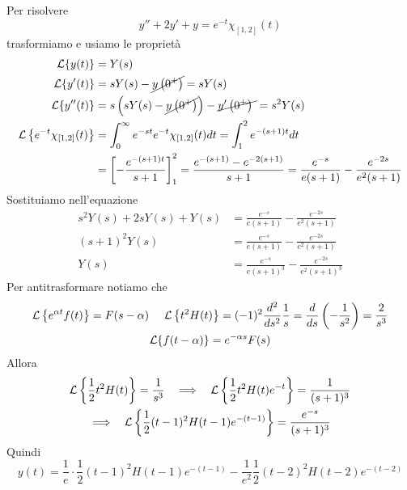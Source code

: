 Per risolvere
\begin{equation*}
y''+2y'+y=e^{-t} \chi _{[ 1,2]}( t)
\end{equation*}
trasformiamo e usiamo le proprietà
\begin{align*}
\mathcal{L}\{y( t)\} & =Y( s)\\
\mathcal{L}\{y'( t)\} & =sY( s) -\cancel{y\left( 0^{+}\right)} =sY( s)\\
\mathcal{L}\{y''( t)\} & =s\left( sY( s) -\cancel{y\left( 0^{+}\right)}\right) -\cancel{y'\left( 0^{+}\right) \ } =s^{2} Y( s)\\
\mathcal{L}\left\{e^{-t} \chi _{[ 1,2]}( t)\right\} & =\int ^{\infty }_{0} e^{-st} e^{-t} \chi _{[ 1,2]}( t) dt=\int ^{2}_{1} e^{-( s+1) t} dt\\
 & =\left[ -\frac{e^{-( s+1) t}}{s+1}\right]^{2}_{1} =\frac{e^{-( s+1)} -e^{-2( s+1)}}{s+1} =\frac{e^{-s}}{e( s+1)} -\frac{e^{-2s}}{e^{2}( s+1)}
\end{align*}
Sostituiamo nell'equazione
\begin{align*}
s^{2} Y( s) +2sY( s) +Y( s) & =\frac{e^{-s}}{e( s+1)} -\frac{e^{-2s}}{e^{2}( s+1)}\\
( s+1)^{2} Y( s) & =\frac{e^{-s}}{e( s+1)} -\frac{e^{-2s}}{e^{2}( s+1)}\\
Y( s) & =\frac{e^{-s}}{e( s+1)^{3}} -\frac{e^{-2s}}{e^{2}( s+1)^{3}}
\end{align*}
Per antitrasformare notiamo che
\begin{gather*}
\Lc\left\{e^{\alpha t} f( t)\right\} =F( s-\alpha ) \ \ \ \ \Lc\left\{t^{2} H( t)\right\} =( -1)^{2}\frac{d^{2}}{ds^{2}}\frac{1}{s} =\frac{d}{ds}\left( -\frac{1}{s^{2}}\right) =\frac{2}{s^{3}}\\
\Lc\{f( t-\alpha )\} =e^{-\alpha s} F( s)
\end{gather*}
Allora
\begin{gather*}
\mathcal{L}\left\{\frac{1}{2} t^{2} H( t)\right\} =\frac{1}{s^{3}} \ \ \implies \ \ \mathcal{L}\left\{\frac{1}{2} t^{2} H( t) e^{-t}\right\} =\frac{1}{( s+1)^{3}}\\
\implies \ \ \mathcal{L}\left\{\frac{1}{2}( t-1)^{2} H( t-1) e^{-( t-1)}\right\} =\frac{e^{-s}}{( s+1)^{3}}
\end{gather*}
Quindi
\begin{equation*}
y( t) =\frac{1}{e} \cdotp \frac{1}{2}( t-1)^{2} H( t-1) e^{-( t-1)} -\frac{1}{e^{2}}\frac{1}{2}( t-2)^{2} H( t-2) e^{-( t-2)}
\end{equation*}
\Soluzione

